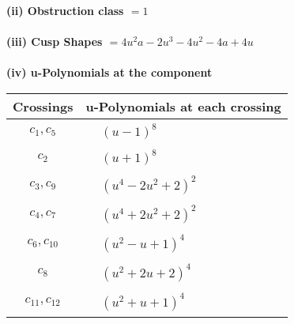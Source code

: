 \documentclass[1p]{elsarticle_modified}
\theoremstyle{definition}
\begin{document}
\flushleft \textbf{(ii) Obstruction class $= 1$}\\~\\
\flushleft \textbf{(iii) Cusp Shapes $= 4 u^2 a-2 u^3-4 u^2-4 a+4 u$}\\~\\
\newpage\renewcommand{\arraystretch}{1}
\flushleft \textbf{(iv) u-Polynomials at the component}\newline \\
\begin{tabular}{m{50pt}|m{274pt}}
Crossings & \hspace{64pt}u-Polynomials at each crossing \\
\hline $$\begin{aligned}c_{1},c_{5}\end{aligned}$$&$\begin{aligned}
&(u-1)^8
\end{aligned}$\\
\hline $$\begin{aligned}c_{2}\end{aligned}$$&$\begin{aligned}
&(u+1)^8
\end{aligned}$\\
\hline $$\begin{aligned}c_{3},c_{9}\end{aligned}$$&$\begin{aligned}
&(u^4-2 u^2+2)^2
\end{aligned}$\\
\hline $$\begin{aligned}c_{4},c_{7}\end{aligned}$$&$\begin{aligned}
&(u^4+2 u^2+2)^2
\end{aligned}$\\
\hline $$\begin{aligned}c_{6},c_{10}\end{aligned}$$&$\begin{aligned}
&(u^2- u+1)^4
\end{aligned}$\\
\hline $$\begin{aligned}c_{8}\end{aligned}$$&$\begin{aligned}
&(u^2+2 u+2)^4
\end{aligned}$\\
\hline $$\begin{aligned}c_{11},c_{12}\end{aligned}$$&$\begin{aligned}
&(u^2+u+1)^4
\end{aligned}$\\
\hline
\end{tabular}\\~\\
\end{document}
